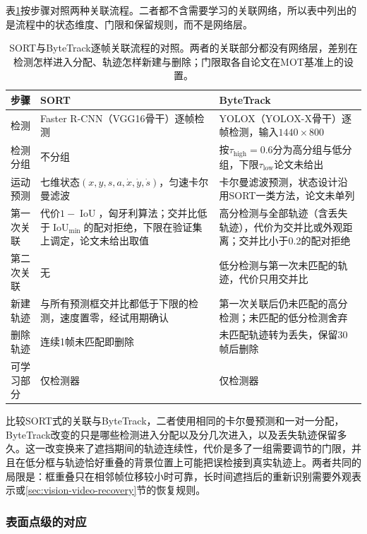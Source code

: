 表\ref{tab:vision-video-mot-pipeline}按步骤对照两种关联流程。二者都不含需要学习的关联网络，所以表中列出的是流程中的状态维度、门限和保留规则，而不是网络层。

\begin{table}[tbp]
  \centering
  \small
  \begin{tabularx}{\linewidth}{@{}lXX@{}}
    \toprule
    步骤 & SORT & ByteTrack\\
    \midrule
    检测 & Faster R-CNN（VGG16骨干）逐帧检测 & YOLOX（YOLOX-X骨干）逐帧检测，输入$1440\times800$\\
    检测分组 & 不分组 & 按$\tau_{\mathrm{high}}=0.6$分为高分组与低分组，下限$\tau_{\mathrm{low}}$论文未给出\\
    运动预测 & 七维状态$(x,y,s,a,\dot{x},\dot{y},\dot{s})$，匀速卡尔曼滤波 & 卡尔曼滤波预测，状态设计沿用SORT一类方法，论文未单列\\
    第一次关联 & 代价$1-\operatorname{IoU}$，匈牙利算法；交并比低于$\operatorname{IoU}_{\min}$的配对拒绝，下限在验证集上调定，论文未给出取值 & 高分检测与全部轨迹（含丢失轨迹），代价为交并比或外观距离；交并比小于0.2的配对拒绝\\
    第二次关联 & 无 & 低分检测与第一次未匹配的轨迹，代价只用交并比\\
    新建轨迹 & 与所有预测框交并比都低于下限的检测，速度置零，经试用期确认 & 第一次关联后仍未匹配的高分检测；未匹配的低分检测舍弃\\
    删除轨迹 & 连续1帧未匹配即删除 & 未匹配轨迹转为丢失，保留30帧后删除\\
    可学习部分 & 仅检测器 & 仅检测器\\
    \bottomrule
  \end{tabularx}
  \caption{SORT与ByteTrack逐帧关联流程的对照。两者的关联部分都没有网络层，差别在检测怎样进入分配、轨迹怎样新建与删除；门限取各自论文在MOT基准上的设置。}
  \label{tab:vision-video-mot-pipeline}
\end{table}

比较SORT式的关联与ByteTrack，二者使用相同的卡尔曼预测和一对一分配，ByteTrack改变的只是哪些检测进入分配以及分几次进入，以及丢失轨迹保留多久。这一改变换来了遮挡期间的轨迹连续性，代价是多了一组需要调节的门限，并且在低分框与轨迹恰好重叠的背景位置上可能把误检接到真实轨迹上。两者共同的局限是：框重叠只在相邻帧位移较小时可靠，长时间遮挡后的重新识别需要外观表示或\ref{sec:vision-video-recovery}节的恢复规则。

\subsubsection{表面点级的对应}
\label{sec:vision-video-d4rt}

